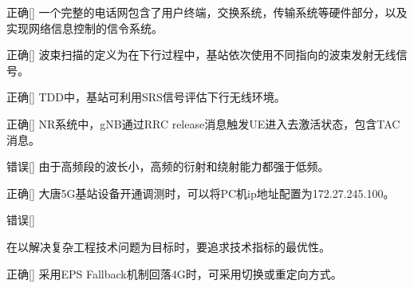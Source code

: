\begin{choice}{\;正确\;}[]
    一个完整的电话网包含了用户终端，交换系统，传输系统等硬件部分，以及实现网络信息控制的信令系统。
\end{choice}

\begin{choice}{\;正确\;}[]
    波束扫描的定义为在下行过程中，基站依次使用不同指向的波束发射无线信号。
\end{choice}

\begin{choice}{\;正确\;}[]
    TDD中，基站可利用SRS信号评估下行无线环境。
\end{choice}

\begin{choice}{\;正确\;}[]
    NR系统中，gNB通过RRC release消息触发UE进入去激活状态，包含TAC消息。

\end{choice}


\begin{choice}{\;错误\;}[]
    由于高频段的波长小，高频的衍射和绕射能力都强于低频。

\end{choice}

\begin{choice}{\;正确\;}[]
    大唐5G基站设备开通调测时，可以将PC机ip地址配置为172.27.245.100。

\end{choice}

\begin{choice}{\;错误\;}[]

    在以解决复杂工程技术问题为目标时，要追求技术指标的最优性。
\end{choice}


\begin{choice}{\;正确\;}[]
    采用EPS Fallback机制回落4G时，可采用切换或重定向方式。

\end{choice}











